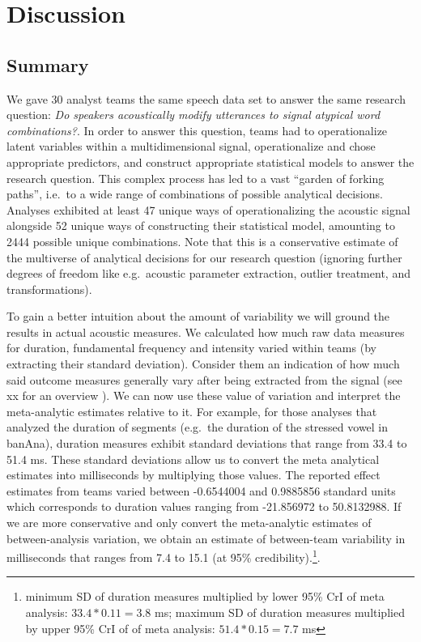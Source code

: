 \documentclass[Review,times,sageh]{sagej}
\begin{document}
\hypertarget{discussion}{%
\section{Discussion}\label{discussion}}

\hypertarget{summary}{%
\subsection{Summary}\label{summary}}

We gave 30 analyst teams the same speech data set to answer the same research question: \emph{Do
speakers acoustically modify utterances to signal atypical word combinations?}.
In order to answer this question, teams had to operationalize latent variables within a multidimensional signal, operationalize and chose appropriate predictors, and construct appropriate statistical models to answer the research question.
This complex process has led to a vast ``garden of forking paths'', i.e.~to a wide range of combinations of possible analytical decisions.
Analyses exhibited at least 47 unique ways of operationalizing the acoustic signal alongside 52 unique ways of constructing their statistical model, amounting to 2444 possible unique combinations.
Note that this is a conservative estimate of the multiverse of analytical decisions for our research question (ignoring further degrees of freedom like e.g.~acoustic parameter extraction, outlier treatment, and transformations).

To gain a better intuition about the amount of variability we will ground the results in actual acoustic measures.
We calculated how much raw data measures for duration, fundamental frequency and intensity varied within teams (by extracting their standard deviation).
Consider them an indication of how much said outcome measures generally vary after being extracted from the signal (see xx for an overview ).
We can now use these value of variation and interpret the meta-analytic estimates relative to it.
For example, for those analyses that analyzed the duration of segments (e.g.~the duration of the stressed vowel in banAna), duration measures exhibit standard deviations that range from 33.4 to 51.4 ms.
These standard deviations allow us to convert the meta analytical estimates into milliseconds by multiplying those values.
The reported effect estimates from teams varied between -0.6544004 and 0.9885856 standard units which corresponds to duration values ranging from -21.856972 to 50.8132988.
If we are more conservative and only convert the meta-analytic estimates of between-analysis variation, we obtain an estimate of between-team variability in milliseconds that ranges from 7.4 to 15.1 (at 95\% credibility).\footnote{minimum SD of duration measures multiplied by lower 95\% CrI of meta analysis: \(33.4 * 0.11 = 3.8\) ms; maximum SD of duration measures multiplied by upper 95\% CrI of of meta analysis: \(51.4 * 0.15 = 7.7\) ms}.
\end{document}
